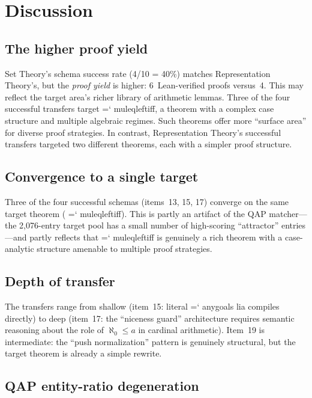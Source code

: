 \documentclass[11pt]{article}
\renewcommand{\texttt}[1]{%
  \begingroup\ttfamily\hyphenchar\font=`\-\relax
  \def\_{\textunderscore\discretionary{}{}{}}%
  #1\endgroup}
\theoremstyle{definition}
\theoremstyle{remark}
\begin{document}
\section{Discussion}\label{sec:discussion}

\subsection{The higher proof yield}

Set Theory's schema success rate (4/10 = 40\%) matches
Representation Theory's, but the \emph{proof yield} is higher:
6~Lean-verified proofs versus~4.  This may reflect the target
area's richer library of arithmetic lemmas.
Three of the four successful transfers target
\texttt{mul\_eq\_left\_iff}, a theorem with a complex case structure
and multiple algebraic regimes.  Such theorems offer more ``surface
area'' for diverse proof strategies.  In contrast, Representation
Theory's successful transfers targeted two different theorems, each
with a simpler proof structure.

\subsection{Convergence to a single target}

Three of the four successful schemas (items~13, 15, 17) converge on
the same target theorem (\texttt{mul\_eq\_left\_iff}).  This is
partly an artifact of the QAP matcher---the 2{,}076-entry target pool
has a small number of high-scoring ``attractor'' entries---and partly
reflects that \texttt{mul\_eq\_left\_iff} is genuinely a rich theorem
with a case-analytic structure amenable to multiple proof strategies.

\subsection{Depth of transfer}

The transfers range from shallow (item~15: literal
\texttt{any\_goals lia} compiles directly) to deep (item~17:
the ``niceness guard'' architecture requires semantic reasoning about
the role of $\aleph_0 \leq a$ in cardinal arithmetic).  Item~19
is intermediate: the ``push normalization'' pattern is genuinely
structural, but the target theorem is already a simple rewrite.

\subsection{QAP entity-ratio degeneration}
\end{document}
